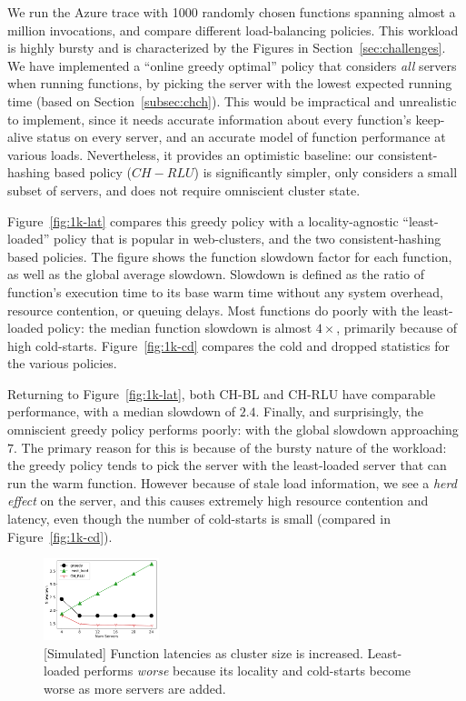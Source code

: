 We run the Azure trace with 1000 randomly chosen functions spanning almost a million invocations, and compare different load-balancing policies.
This workload is highly bursty and is characterized by the Figures in Section~\ref{sec:challenges}. 
We have implemented a ``online greedy optimal'' policy that considers \emph{all} servers when running functions, by picking the server with the lowest expected running time (based on Section~\ref{subsec:chch}).
This would be impractical and unrealistic to implement, since it needs accurate information about every function's keep-alive status on every server, and an accurate model of function performance at various loads.
Nevertheless, it provides an optimistic baseline: our consistent-hashing based policy ($CH-RLU$) is significantly simpler, only considers a small subset of servers, and does not require omniscient cluster state. 

Figure~\ref{fig:1k-lat} compares this greedy policy with a locality-agnostic ``least-loaded'' policy that is popular in web-clusters, and the two consistent-hashing based policies. 
The figure shows the function slowdown factor for each function, as well as the global average slowdown.
Slowdown is defined as the ratio of function's execution time to its base warm time without any system overhead, resource contention, or queuing delays.
Most functions do poorly with the least-loaded policy: the median function slowdown is almost $4\times$, primarily because of high cold-starts.
Figure~\ref{fig:1k-cd} compares the cold and dropped statistics for the various policies.

Returning to Figure~\ref{fig:1k-lat}, both CH-BL and CH-RLU have comparable performance, with a median slowdown of $2.4$. 
Finally, and surprisingly, the omniscient greedy policy performs poorly: with the global slowdown approaching $7$.
The primary reason for this is because of the bursty nature of the workload: the greedy policy tends to pick the server with the least-loaded server that can run the warm function.
However because of stale load information, we see a \emph{herd effect} on the server, and this causes extremely high resource contention and latency, even though the number of cold-starts is small (compared in Figure~\ref{fig:1k-cd}). 



\begin{figure}
  \centering
  \includegraphics[width=0.3\textwidth]{chrlu/faaslb-osdi22/figs/1k/latencies-250scaling.pdf}
  \caption{[Simulated] Function latencies as cluster size is increased. Least-loaded performs \emph{worse} because its locality and cold-starts become worse as more servers are added.}
  \label{fig:1k-scaling}
\end{figure}


